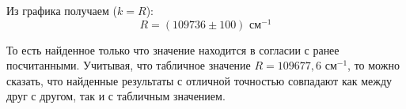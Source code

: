 \begin{enumerate}
	Из графика получаем ($k = R$):
	\begin{equation*}
		\boxed{R = (109736 \pm 100) \text{ см}^{-1}}
	\end{equation*}

	То есть найденное только что значение находится в согласии с ранее посчитанными.
	Учитывая, что табличное значение $R = 109677,6$ см$^{-1}$, то можно сказать, что найденные результаты с отличной точностью совпадают как между друг с другом, так и с табличным значением. 

	\end{enumerate}

	\newpage
	\begin{table}[h!]
		\centering
		\caption{Итоговая таблица}
	\end{table}
	
